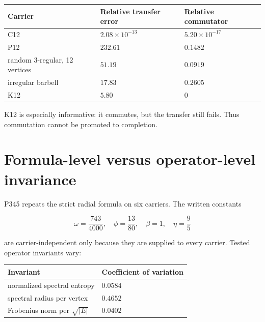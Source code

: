 \documentclass[11pt,a4paper,openany]{report}
\begin{document}
\begin{center}
\begingroup\small
\setlength{\tabcolsep}{2.5pt}
\renewcommand{\arraystretch}{1.16}
\begin{longtable}{@{}p{}p{}p{}@{}}
\toprule
\textbf{Carrier} & \textbf{Relative transfer error} & \textbf{Relative commutator} \\
\midrule
\endhead
C12 & \(2.08\times10^{-13}\) & \(5.20\times10^{-17}\) \\
P12 & \(232.61\) & \(0.1482\) \\
random 3-regular, 12 vertices & \(51.19\) & \(0.0919\) \\
irregular barbell & \(17.83\) & \(0.2605\) \\
K12 & \(5.80\) & \(0\) \\
\bottomrule
\end{longtable}
\endgroup
\end{center}

K12 is especially informative: it commutes, but the transfer still fails. Thus commutation cannot be promoted to completion.

\section{Formula-level versus operator-level invariance}

P345 repeats the strict radial formula on six carriers. The written constants

\[
\omega=\frac{743}{4000},\quad
\phi=\frac{13}{80},\quad
\beta=1,\quad
\eta=\frac95
\]

are carrier-independent only because they are supplied to every carrier. Tested operator invariants vary:

\begin{center}
\begingroup\small
\setlength{\tabcolsep}{2.5pt}
\renewcommand{\arraystretch}{1.16}
\begin{longtable}{@{}p{}p{}@{}}
\toprule
\textbf{Invariant} & \textbf{Coefficient of variation} \\
\midrule
\endhead
normalized spectral entropy & \(0.0584\) \\
spectral radius per vertex & \(0.4652\) \\
Frobenius norm per \(\sqrt{|E|}\) & \(0.0402\) \\
\bottomrule
\end{longtable}
\endgroup
\end{center}
\end{document}
